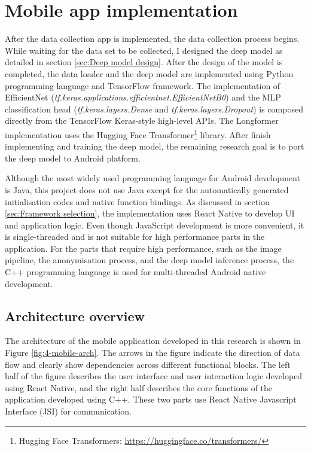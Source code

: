 \section{Mobile app implementation}
\label{sec:Mobile app implementation}
After the data collection app is implemented, the data collection process begins.
While waiting for the data set to be collected, I designed the deep model as detailed in section \ref{sec:Deep model design}.
After the design of the model is completed, the data loader and the deep model are implemented using Python programming language and TensorFlow framework.
The implementation of EfficientNet (\textit{tf.keras.applications.efficientnet.EfficientNetB0}) and the MLP classification head (\textit{tf.keras.layers.Dense} and \textit{tf.keras.layers.Dropout}) is composed directly from the TensorFlow Keras-style high-level APIs.
The Longformer implementation uses the Hugging Face Transformer\footnote{Hugging Face Transformers: \url{https://huggingface.co/transformers/}} library.
After finish implementing and training the deep model, the remaining research goal is to port the deep model to Android platform.

Although the most widely used programming language for Android development is Java, this project does not use Java except for the automatically generated initialisation codes and native function bindings.
As discussed in section \ref{sec:Framework selection}, the implementation uses React Native to develop UI and application logic.
Even though JavaScript development is more convenient, it is single-threaded and is not suitable for high performance parts in the application.
For the parts that require high performance, such as the image pipeline, the anonymisation process, and the deep model inference process, the C++ programming language is used for multi-threaded Android native development.

\subsection{Architecture overview}
The architecture of the mobile application developed in this research is shown in Figure \ref{fig:4-mobile-arch}.
The arrows in the figure indicate the direction of data flow and clearly show dependencies across different functional blocks.
The left half of the figure describes the user interface and user interaction logic developed using React Native, and the right half describes the core functions of the application developed using C++.
These two parts use React Native Javascript Interface (JSI) for communication.

